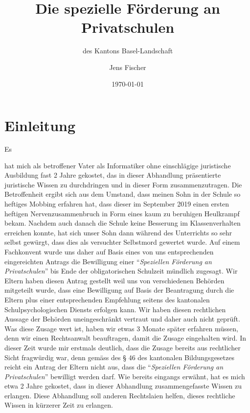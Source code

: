 \documentclass[10pt,parskip]{scrbook}
\title{Die spezielle Förderung an Privatschulen}
\subtitle{des Kantons Basel-Landschaft}
\author{Jens Fischer}
\date{\today}
\newcounter{rz}
\newcommand{\Rz}{\addtocounter{rz}{1}\marginpar{\texttt{\textit{A\arabic{rz}}}}}
\begin{document}
\maketitle


\tableofcontents

\chapter{Einleitung}\label{chap:Einleitung}
Es \Rz hat mich als betroffener Vater als Informatiker ohne einschlägige juristische Ausbildung fast 2 Jahre gekostet, das in dieser Abhandlung präsentierte juristische Wissen zu durchdringen und in dieser Form zusammenzutragen. Die Betroffenheit ergibt sich aus dem Umstand, dass meinen Sohn in der Schule so heftiges Mobbing erfahren hat, dass dieser im September 2019 einen ersten heftigen Nervenzusammenbruch in Form eines kaum zu beruhigen Heulkrampf bekam. Nachdem auch danach die Schule keine Besserung im Klassenverhalten erreichen konnte, hat sich unser Sohn dann während des Unterrichts so sehr selbst gewürgt, dass dies als versuchter Selbstmord gewertet wurde. Auf einem Fachkonvent wurde uns daher auf Basis eines von uns entsprechenden eingereichten Antrags die Bewilligung einer "`\textsl{Speziellen Förderung an Privatschulen}"' bis Ende der obligatorischen Schulzeit mündlich zugesagt. Wir Eltern haben diesen Antrag gestellt weil uns von verschiedenen Behörden mitgeteilt wurde, dass eine Bewilligung auf Basis der Beantragung durch die Eltern plus einer entsprechenden Empfehlung seitens des kantonalen Schulpsychologischen Diensts erfolgen kann. Wir haben diesen rechtlichen Aussage der Behörden uneingeschränkt vertraut und daher auch nicht geprüft. \\   
Was diese Zusage wert ist, haben wir etwas 3 Monate später erfahren müssen, denn wir einen Rechtsanwalt beauftragen, damit die Zusage eingehalten wird. In dieser Zeit wurde mir erstmals deutlich, dass die Zusage bereits aus rechtlicher Sicht fragwürdig war, denn gemäss des § 46 des kantonalen Bildungsgesetzes reicht ein Antrag der Eltern nicht aus, dass die "`\textsl{Speziellen Förderung an Privatschulen}"' bewilligt werden darf. Wie bereits eingangs erwähnt, hat es mich etwa 2 Jahre gekostet, dass in dieser Abhandlung zusammengefasste Wissen zu erlangen. Diese Abhandlung soll anderen Rechtslaien helfen, dieses rechtliche Wissen in kürzerer Zeit zu erlangen.\\
\end{document}
